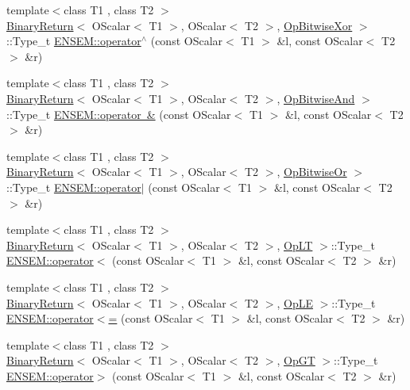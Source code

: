 \begin{DoxyCompactItemize}
\item 
{\footnotesize template$<$class T1 , class T2 $>$ }\\\mbox{\hyperlink{structBinaryReturn}{Binary\+Return}}$<$ O\+Scalar$<$ T1 $>$, O\+Scalar$<$ T2 $>$, \mbox{\hyperlink{structOpBitwiseXor}{Op\+Bitwise\+Xor}} $>$\+::Type\+\_\+t \mbox{\hyperlink{group__obsscalar_gaa01a2cce660b21ea1e2ea9a876a1cd03}{E\+N\+S\+E\+M\+::operator$^\wedge$}} (const O\+Scalar$<$ T1 $>$ \&l, const O\+Scalar$<$ T2 $>$ \&r)
\item 
{\footnotesize template$<$class T1 , class T2 $>$ }\\\mbox{\hyperlink{structBinaryReturn}{Binary\+Return}}$<$ O\+Scalar$<$ T1 $>$, O\+Scalar$<$ T2 $>$, \mbox{\hyperlink{structOpBitwiseAnd}{Op\+Bitwise\+And}} $>$\+::Type\+\_\+t \mbox{\hyperlink{group__obsscalar_ga0ce8b28e6efb00e905152096020cfafe}{E\+N\+S\+E\+M\+::operator \&}} (const O\+Scalar$<$ T1 $>$ \&l, const O\+Scalar$<$ T2 $>$ \&r)
\item 
{\footnotesize template$<$class T1 , class T2 $>$ }\\\mbox{\hyperlink{structBinaryReturn}{Binary\+Return}}$<$ O\+Scalar$<$ T1 $>$, O\+Scalar$<$ T2 $>$, \mbox{\hyperlink{structOpBitwiseOr}{Op\+Bitwise\+Or}} $>$\+::Type\+\_\+t \mbox{\hyperlink{group__obsscalar_ga9243675542e15046a4e7b9f570ba66d1}{E\+N\+S\+E\+M\+::operator$\vert$}} (const O\+Scalar$<$ T1 $>$ \&l, const O\+Scalar$<$ T2 $>$ \&r)
\item 
{\footnotesize template$<$class T1 , class T2 $>$ }\\\mbox{\hyperlink{structBinaryReturn}{Binary\+Return}}$<$ O\+Scalar$<$ T1 $>$, O\+Scalar$<$ T2 $>$, \mbox{\hyperlink{structOpLT}{Op\+LT}} $>$\+::Type\+\_\+t \mbox{\hyperlink{group__obsscalar_gaf1a8a81f23c6d685296f296827d2a4f0}{E\+N\+S\+E\+M\+::operator$<$}} (const O\+Scalar$<$ T1 $>$ \&l, const O\+Scalar$<$ T2 $>$ \&r)
\item 
{\footnotesize template$<$class T1 , class T2 $>$ }\\\mbox{\hyperlink{structBinaryReturn}{Binary\+Return}}$<$ O\+Scalar$<$ T1 $>$, O\+Scalar$<$ T2 $>$, \mbox{\hyperlink{structOpLE}{Op\+LE}} $>$\+::Type\+\_\+t \mbox{\hyperlink{group__obsscalar_gaf2d22d4258136c38dba73b6d210b7048}{E\+N\+S\+E\+M\+::operator$<$=}} (const O\+Scalar$<$ T1 $>$ \&l, const O\+Scalar$<$ T2 $>$ \&r)
\item 
{\footnotesize template$<$class T1 , class T2 $>$ }\\\mbox{\hyperlink{structBinaryReturn}{Binary\+Return}}$<$ O\+Scalar$<$ T1 $>$, O\+Scalar$<$ T2 $>$, \mbox{\hyperlink{structOpGT}{Op\+GT}} $>$\+::Type\+\_\+t \mbox{\hyperlink{group__obsscalar_ga8a16530cd60ff38f2be9575251898ac2}{E\+N\+S\+E\+M\+::operator$>$}} (const O\+Scalar$<$ T1 $>$ \&l, const O\+Scalar$<$ T2 $>$ \&r)

\end{DoxyCompactItemize}
